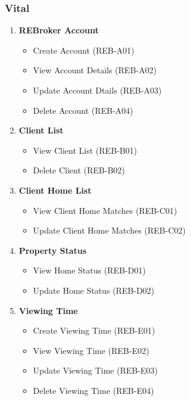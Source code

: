 \documentclass[11pt]{article}
\begin{document}
			\subsubsection{Vital}
			\begin{enumerate}[i]
				\item \textbf{REBroker Account}
				\begin{itemize}
					\item Create Account (REB-A01)
					\item View Account Details (REB-A02)
					\item Update Account Dtails (REB-A03)
					\item Delete Account (REB-A04)
				\end{itemize}
				
				\item \textbf{Client List}
				\begin{itemize}
					\item View Client List (REB-B01)
					\item Delete Client (REB-B02)
				\end{itemize}
				
				\item \textbf{Client Home List}
				\begin{itemize}
					\item View Client Home Matches (REB-C01)
					\item Update Client Home Matches (REB-C02)
				\end{itemize}
				
				\item \textbf{Property Status}
				\begin{itemize}
					\item View Home Status (REB-D01)
					\item Update Home Status (REB-D02)
				\end{itemize}
				\item \textbf{Viewing Time}
				\begin{itemize}
					\item Create Viewing Time (REB-E01)
					\item View Viewing Time (REB-E02)
					\item Update Viewing Time (REB-E03)
					\item Delete Viewing Time (REB-E04)
				\end{itemize}
			\end{enumerate}
			
\end{document}
